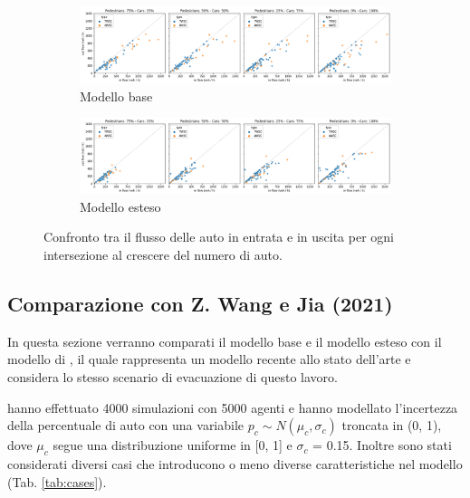 \begin{figure}[ht]
    \centering
    \begin{subfigure}{\textwidth}
        \centering
        \includegraphics[width=\textwidth]{images/analisi/comparison-base-in-out-flow-car.png}
        \caption{Modello base}
    \end{subfigure}

    \begin{subfigure}{\textwidth}
        \centering
        \includegraphics[width=\textwidth]{images/analisi/comparison-new-in-out-flow-car.png}
        \caption{Modello esteso}
    \end{subfigure}
    \caption{
        Confronto tra il flusso delle auto in entrata e in uscita per ogni intersezione al crescere del numero di auto.
    }
    \label{fig:analisi-comparison-in-out-flow-car}
\end{figure}

\pagebreak



\subsection{Comparazione con Z. Wang e Jia (2021)}
In questa sezione verranno comparati il modello base e il modello esteso con il modello di \textcite{wang2021novel},
il quale rappresenta un modello recente allo stato dell'arte e considera lo stesso scenario di evacuazione di questo lavoro.

\textcite{wang2021novel} hanno effettuato 4000 simulazioni con 5000 agenti e
hanno modellato l'incertezza della percentuale di auto con una variabile $p_c \sim N(\mu_c, \sigma_c)$ troncata in (0, 1),
dove $\mu_c$ segue una distribuzione uniforme in [0, 1] e $\sigma_c$ = 0.15.
Inoltre sono stati considerati diversi casi che introducono o meno diverse caratteristiche nel modello (Tab. \ref{tab:cases}).

